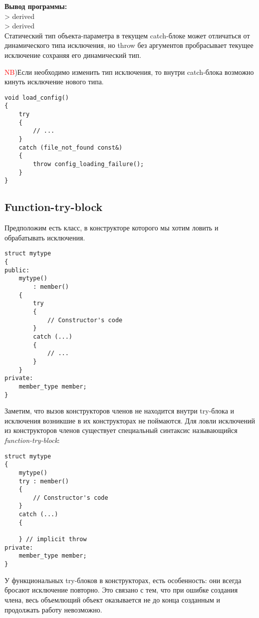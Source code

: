 \textbf{Вывод программы:} \\
> derived \\
> derived \\

Статический тип объекта-параметра в текущем catch-блоке может отличаться от динамического типа исключения, но throw без аргументов пробрасывает текущее исключение сохраняя его динамический тип.

\textcolor{red}{NB})Если необходимо изменить тип исключения, то внутри catch-блока возможно кинуть исключение нового типа.

\begin{verbatim}
void load_config()
{
    try
    {
        // ...
    }
    catch (file_not_found const&)
    {
        throw config_loading_failure();
    }
}
\end{verbatim}

\subsection{Function-try-block}

Предположим есть класс, в конструкторе которого мы хотим ловить и обрабатывать исключения.
\begin{verbatim}
struct mytype
{
public:
    mytype()
        : member()
    {
        try
        {
            // Constructor's code
        }
        catch (...)
        {
            // ...
        }
    }
private:
    member_type member;
}
\end{verbatim}

Заметим, что вызов конструкторов членов не находится внутри try-блока и исключения возникшие в их конструкторах не поймаются. Для ловли исключений из конструкторов членов существует специальный синтаксис называющийся {\it function-try-block}:

\begin{verbatim}
struct mytype
{
    mytype()
    try : member()
    {
        // Constructor's code
    }
    catch (...)
    {

    } // implicit throw
private:
    member_type member;
}
\end{verbatim}

У функциональных try-блоков в конструкторах, есть особенность: они всегда бросают исключение повторно. Это связано с тем, что при ошибке создания члена, весь объемлющий объект оказывается не до конца созданным и продолжать работу невозможно.

